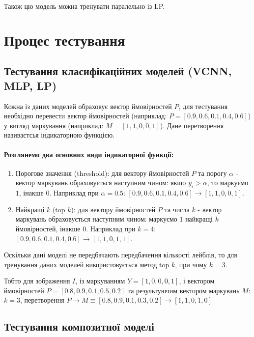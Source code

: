 \documentclass{udstu}
\begin{document}
Також цю модель можна тренувати паралельно із LP.


\section{Процес тестування}

\subsection{Тестування класифікаційних моделей (VCNN, MLP, LP)}

Кожна із даних моделей обраховує вектор ймовірностей $P$,
для тестування необхідно перевести вектор ймовірностей (наприклад: $P = [0.9, 0.6, 0.1, 0.4, 0.6]$)
у вигляд маркування (наприклад: $M = [1,1,0,0,1]$). Дане перетворення називаєтсья індикаторною функцією.

\paragraph{Розглянемо два основних види індикаторної функції:}

\begin{enumerate}[1)]
	\item Порогове значення (threshold):
	для вектору ймовірностей $P$ та порогу $\alpha$ - вектор маркувань обраховується наступним чином:
	якщо $y_i > \alpha$, то маркуємо $1$, інакше $0$.
	Наприклад при $\alpha = 0.5$: $[0.9, 0.6, 0.1, 0.4, 0.6] \to [1,1,0,0,1]$.

	\item Найкращі $k$ (top $k$):
	для вектору ймовірностей $P$ та числа $k$ - вектор маркувань обраховується наступним чином:
	маркуємо $1$ найкращі $k$ ймовірностей, інакше $0$.
	Наприклад при $k = 4$: $[0.9, 0.6, 0.1, 0.4, 0.6] \to [1,1,0,1,1]$.
\end{enumerate}

Оскільки дані моделі не передбачають передбачення кількості лейблів,
то для тренування даних моделей використовується метод top $k$, при чому
$k = 3$.

\label{dynk}

Тобто для зображення $I$,
із маркуванням $Y = [1,0,0,0,1]$,
і вектором ймовірностей $P = [0.8,0.9,0.1,0.5,0.2]$
та результуючим вектором маркувань $M$:
$k = 3$, перетворення $P \to M \equiv [0.8,0.9,0.1,0.3,0.2] \to [1,1,0,1,0]$


\subsection{Тестування композитної моделі}
\end{document}

